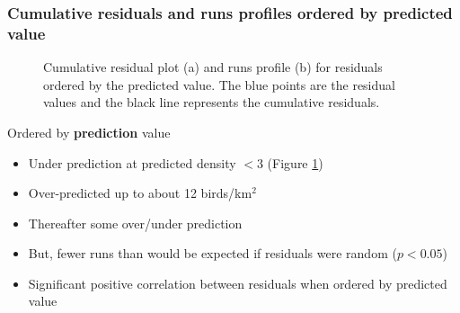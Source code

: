 \begin{frame}[fragile]
\frametitle{Cumulative residuals and runs profiles ordered by predicted value}
\begin{figure}[h!]
  \centering
    \caption{Cumulative residual plot (a) and runs profile (b) for residuals ordered by the predicted value.  The blue points are the residual values and the black line represents the cumulative residuals.}
  \label{fig:nsgeeruns2}
\end{figure}
\end{frame}

\begin{frame}[fragile]
Ordered by \textbf{prediction} value
\begin{itemize}
\item Under prediction at predicted density $< 3$ (Figure \ref{fig:nsgeeruns2})
\item Over-predicted up to about 12 birds/km$^2$
\item Thereafter some over/under prediction
\item But, fewer runs than would be expected if residuals were random ($p<0.05$)
\item Significant positive correlation between residuals when ordered by predicted value
\end{itemize}
\end{frame}

